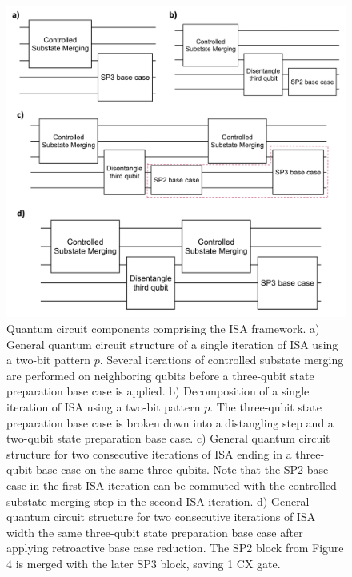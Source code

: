 \begin{figure}[h]
\centering
\includegraphics[width=0.95\linewidth]{main/figs/sfig_1.png}
\caption{Quantum circuit components comprising the ISA framework. a) General quantum circuit structure of a single iteration of ISA using a
two-bit pattern $p$. Several iterations of controlled substate merging are
performed on neighboring qubits before a three-qubit state preparation base case
is applied. b) Decomposition of a single iteration of ISA using a two-bit pattern $p$.
The three-qubit state preparation base case is broken down into a distangling
step and a two-qubit state preparation base case. c) General quantum circuit structure for two consecutive iterations of ISA
ending in a three-qubit base case on the same three qubits. Note that the SP2 
base case in the first ISA iteration can be commuted with the controlled substate
merging step in the second ISA iteration. d) General quantum circuit structure for two consecutive iterations of ISA
width the same three-qubit state preparation base case after applying retroactive
base case reduction. The SP2 block from Figure 4 is merged with the later SP3
block, saving 1 CX gate.}
\label{sfig1}
\end{figure}

